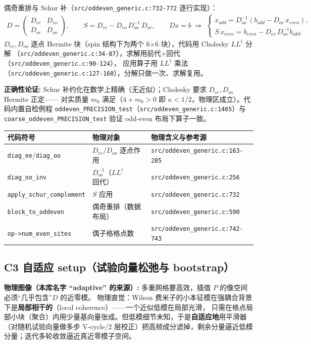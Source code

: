 \documentclass[UTF8]{ctexart}
\begin{document}
偶奇重排与 Schur 补（\texttt{\nolinkurl{src/oddeven_generic.c:732-772}} 逐行实现）：
\begin{align}
D = \begin{pmatrix} D_{ee} & D_{eo}\\ D_{oe} & D_{oo} \end{pmatrix},
\qquad
S = D_{ee} - D_{eo}\,D_{oo}^{-1}\,D_{oe},
\qquad
D x = b \;\Rightarrow\; \begin{cases}
x_{odd} = D_{oo}^{-1}(b_{odd}-D_{oe}\,x_{even}),\\
S\,x_{even} = b_{even}-D_{eo}\,D_{oo}^{-1}b_{odd}.
\end{cases}
\label{eq:schur}
\end{align}
$D_{ee},D_{oo}$ 逐点 Hermite 块（spin 结构下为两个 6$\times$6 块），代码用 Cholesky $LL^\dagger$ 分解
（\texttt{\nolinkurl{src/oddeven_generic.c:34-87}}），求解用前代+回代（\texttt{\nolinkurl{src/oddeven_generic.c:90-124}}），
应用算子用 $LL^\dagger$ 乘法（\texttt{\nolinkurl{src/oddeven_generic.c:127-160}}），分解只做一次、求解复用。

\textbf{正确性论证:} Schur 补约化在数学上精确（无近似）；Cholesky 要求 $D_{ee},D_{oo}$ Hermite 正定——
对实质量 $m_0$ 满足（$4+m_0>0$ 即 $\kappa<1/2$，物理区成立）。代码内置自检例程
\texttt{oddeven\_PRECISION\_test}（\texttt{\nolinkurl{src/oddeven_generic.c:1465}}）与
\texttt{coarse\_oddeven\_PRECISION\_test} 验证 odd-even 布局下算子一致。

\begin{xltabular}{\textwidth}{llX}
\toprule
\textcolor{map}{代码符号} & 物理对象 & 物理含义与参考源 \\
\midrule
\endhead
\texttt{diag\_ee}/\texttt{diag\_oo} & $D_{ee}$/$D_{oo}$ 逐点作用 & \texttt{\nolinkurl{src/oddeven_generic.c:163-285}} \\
\texttt{diag\_oo\_inv} & $D_{oo}^{-1}$（$LL^\dagger$ 回代） & \texttt{\nolinkurl{src/oddeven_generic.c:256}} \\
\texttt{apply\_schur\_complement} & $S$ 应用 & \texttt{\nolinkurl{src/oddeven_generic.c:732}} \\
\texttt{block\_to\_oddeven} & 偶奇重排（数据布局） & \texttt{\nolinkurl{src/oddeven_generic.c:590}} \\
\texttt{op->num\_even\_sites} & 偶子格格点数 & \texttt{\nolinkurl{src/oddeven_generic.c:742-743}} \\
\bottomrule
\end{xltabular}

\subsection{C3 自适应 setup（试验向量松弛与 bootstrap）}
\begin{physbox}
\textbf{物理图像（本库名字 ``adaptive'' 的来源）:} 多重网格要高效，插值 $P$ 的像空间必须``几乎包含''$D$ 的近零模。
物理直觉：Wilson 费米子的小本征模在强耦合背景下是\textbf{局部相干的}（local coherence）——一个近似低模在局部光滑，
只需在格点局部小块（聚合）内用少量基向量张成。但低模细节未知，于是\textbf{自适应地}用平滑器
（对随机试验向量做多步 V-cycle/2 层校正）把高频成分滤掉，剩余分量逼近低模分量；迭代多轮收敛逼近真近零模子空间。
\end{physbox}
\end{document}
